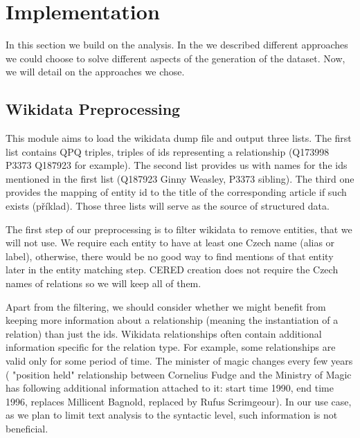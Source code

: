 \section{Implementation}

In this section we build on the analysis. In the  we described different approaches we could choose to solve different aspects of the generation of the dataset. Now, we will detail on the approaches we chose.


\subsection{Wikidata Preprocessing}
\label{sec:wikidata_preprocessing_implementation}
This module aims to load the wikidata dump file and output three lists. The first list contains QPQ triples, triples of ids representing a relationship (Q173998 P3373 Q187923 for example). The second list provides us with names for the ids mentioned in the first list (Q187923 Ginny Weasley, P3373 sibling). The third one provides the mapping of entity id to the title of the corresponding article if such exists (příklad). Those three lists will serve as the source of structured data.

The first step of our preprocessing is to filter wikidata to remove entities, that we will not use. We require each entity to have at least one Czech name (alias or label), otherwise, there would be no good way to find mentions of that entity later in the entity matching step. CERED creation does not require the Czech names of relations so we will keep all of them.

Apart from the filtering, we should consider whether we might benefit from keeping more information about a relationship (meaning the instantiation of a relation) than just the ids. Wikidata relationships often contain additional information specific for the relation type. For example, some relationships are valid only for some period of time. The minister of magic changes every few years ( "position held" relationship between Cornelius Fudge and the Ministry of Magic has following additional information attached to it: start time 1990, end time 1996, replaces Millicent Bagnold, replaced by Rufus Scrimgeour). In our use case, as we plan to limit text analysis to the syntactic level, such information is not beneficial. 

